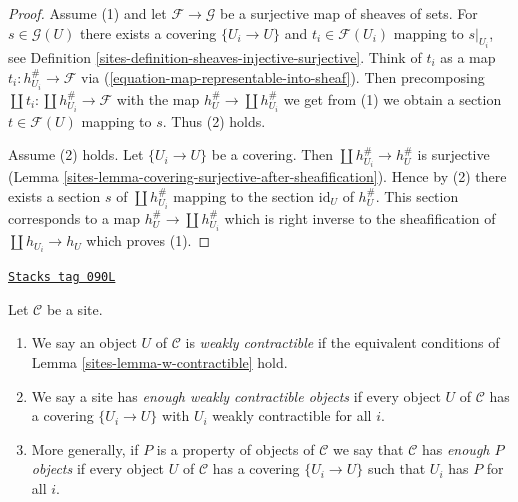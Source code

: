 \begin{proof}

Assume (1) and let $\mathcal{F} \to \mathcal{G}$ be a surjective map of
sheaves of sets. For $s \in \mathcal{G}(U)$ there exists a covering
$\{U_i \to U\}$ and $t_i \in \mathcal{F}(U_i)$ mapping to
$s|_{U_i}$, see Definition \ref{sites-definition-sheaves-injective-surjective}.
Think of $t_i$ as a map $t_i : h_{U_i}^\# \to \mathcal{F}$ via
(\ref{equation-map-representable-into-sheaf}).
Then precomposing $\coprod t_i : \coprod h_{U_i}^\# \to \mathcal{F}$
with the map $h_U^\# \to \coprod h_{U_i}^\#$ we get from (1)
we obtain a section $t \in \mathcal{F}(U)$ mapping to $s$.
Thus (2) holds.

\medskip\noindent
Assume (2) holds. Let $\{U_i \to U\}$ be a covering.
Then $\coprod h_{U_i}^\# \to h_U^\#$ is surjective
(Lemma \ref{sites-lemma-covering-surjective-after-sheafification}).
Hence by (2) there exists a section $s$ of $\coprod h_{U_i}^\#$ mapping
to the section $\text{id}_U$ of $h_U^\#$. This section corresponds to a map
$h_U^\# \to \coprod h_{U_i}^\#$ which is right inverse to the sheafification
of $\coprod h_{U_i} \to h_U$ which proves (1).
\end{proof}

\begin{definition}[W contractible]
\label{sites-definition-w-contractible}
\href{https://stacks.math.columbia.edu/tag/090L}{\texttt{Stacks tag 090L}}

Let $\mathcal{C}$ be a site.
\begin{enumerate}
\item We say an object $U$ of $\mathcal{C}$ is {\it weakly contractible}
if the equivalent conditions of Lemma \ref{sites-lemma-w-contractible} hold.
\item We say a site has {\it enough weakly contractible objects}
if every object $U$ of $\mathcal{C}$ has a covering $\{U_i \to U\}$
with $U_i$ weakly contractible for all $i$.
\item More generally, if $P$ is a property of objects of $\mathcal{C}$
we say that $\mathcal{C}$ has {\it enough $P$ objects} if every object $U$ of
$\mathcal{C}$ has a covering $\{U_i \to U\}$ such that $U_i$ has $P$
for all $i$.
\end{enumerate}
\end{definition}

